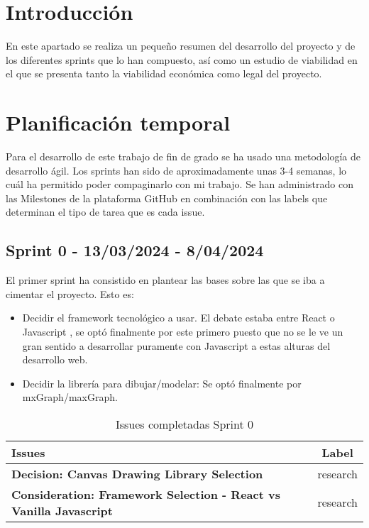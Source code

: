 
\section{Introducción}
En este apartado se realiza un pequeño resumen del desarrollo del proyecto y de los diferentes sprints que lo han compuesto, así como un estudio de viabilidad en el que se presenta tanto la viabilidad económica como legal del proyecto.

\section{Planificación temporal}
Para el desarrollo de este trabajo de fin de grado se ha usado una metodología de desarrollo ágil. Los sprints han sido de aproximadamente unas 3-4 semanas, lo cuál ha permitido poder compaginarlo con mi trabajo.
Se han administrado con las Milestones de la plataforma GitHub en combinación con las labels que determinan el tipo de tarea que es cada issue.


\subsection{Sprint 0 - 13/03/2024 - 8/04/2024 }
El primer sprint ha consistido en plantear las bases sobre las que se iba a cimentar el proyecto. Esto es:
\begin{itemize}
    \item Decidir el framework tecnológico a usar. El debate estaba entre React \cite{react} o Javascript \cite{wiki:javascript}, se optó finalmente por este primero puesto que no se le ve un gran sentido a desarrollar puramente con Javascript a estas alturas del desarrollo web.
    \item Decidir la librería para dibujar/modelar: Se optó finalmente por mxGraph\cite{mxgraph}/maxGraph\cite{maxgraph}.
\end{itemize}


\begin{table}[ht!]
    \centering
    \resizebox{14cm}{!} {
    \begin{tabular}{|l|c|}
    \hline
    \rowcolor[rgb]{0.9, 0.9, 0.9}
    \textbf{Issues} & \textbf{Label} \\ \hline
    \textbf{Decision: Canvas Drawing Library Selection} & \cellcolor[rgb]{0.83, 0.77, 0.97}research \\ \hline 
    \textbf{Consideration: Framework Selection - React vs Vanilla Javascript} & \cellcolor[rgb]{0.83, 0.77, 0.97}research \\ \hline 
    \end{tabular}}
    \caption{Issues completadas Sprint 0}
\end{table}

